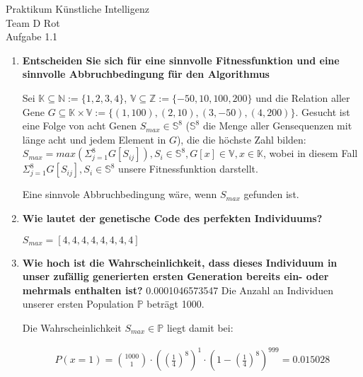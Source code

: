 \documentclass[12pt, twoside]{article}
\begin{document}
\begin{center}
  \Huge{Praktikum K\"unstliche Intelligenz} \\
  \huge{Team D Rot} \\
  \Large{Aufgabe 1.1} \\
\end{center}

\begin{enumerate}[label={\textbf{\alph*)}}]

  \item \textbf{Entscheiden Sie sich f\"ur eine sinnvolle
          Fitnessfunktion und eine sinnvolle
          Abbruchbedingung f\"ur den Algorithmus}

        Sei $\mathbb{K} \subseteq \mathbb{N}:=\{1,2,3,4\}$,
        $\mathbb{V} \subseteq \mathbb{Z} := \{-50,10,100,
        200\}$ und die Relation aller Gene $G \subseteq
        \mathbb{K} \times \mathbb{V} := \{(1,100), (2,10),
        (3, -50),(4, 200)\}$. Gesucht ist eine Folge von
        acht Genen $S_{max} \in \mathbb{S}^8$
        ($\mathbb{S}^8$ die Menge aller Gensequenzen mit
        l\"ange acht und jedem Element in $G$), die die
        h\"ochste Zahl bilden:
        $S_{max} = max(\Sigma_{j=1}^{8} G[S_{ij}]), S_{i}
        \in \mathbb{S}^8, G[x] \in \mathbb{V}, x \in
        \mathbb{K}$,
        wobei in diesem Fall
        $\Sigma_{j=1}^{8} G[S_{ij}],S_{i} \in \mathbb{S}^8$
        unsere Fitnessfunktion darstellt.

        Eine sinnvole Abbruchbedingung w\"are, wenn
        $S_{max}$ gefunden ist.

  \item \textbf{Wie lautet der genetische Code des
          perfekten Individuums?}

        $S_{max} = [4, 4, 4, 4, 4, 4, 4, 4]$

  \item \textbf{Wie hoch ist die Wahrscheinlichkeit, dass
          dieses Individuum in unser zuf\"allig generierten
          ersten Generation bereits ein- oder mehrmals
          enthalten ist?}
0.0001046573547
        Die Anzahl an Individuen unserer ersten Population
        $\mathbb{P}$ betr\"agt 1000.

        Die Wahrscheinlichkeit $S_{max} \in \mathbb{P}$
        liegt damit bei:

        \begin{align*}
         P(x=1) = \binom{1000}{1} \cdot ((\frac{1}{4})^8)^1 \cdot (1 - (\frac{1}{4})^8)^{999} = 0.015028
          \end{align*}
       


\end{enumerate}
\end{document}
